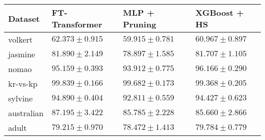 \begin{tabular}{llll}
\toprule
Dataset & FT-Transformer & MLP + Pruning & XGBoost + HS \\
\midrule
volkert & $62.373 \pm 0.915$ & $59.915 \pm 0.781$ & $60.967 \pm 0.897$ \\
jasmine & $81.890 \pm 2.149$ & $78.897 \pm 1.585$ & $81.707 \pm 1.105$ \\
nomao & $95.159 \pm 0.393$ & $93.912 \pm 0.775$ & $96.166 \pm 0.290$ \\
kr-vs-kp & $99.839 \pm 0.166$ & $99.682 \pm 0.173$ & $99.368 \pm 0.205$ \\
sylvine & $94.890 \pm 0.404$ & $92.811 \pm 0.559$ & $94.427 \pm 0.623$ \\
australian & $87.195 \pm 3.422$ & $85.785 \pm 2.228$ & $85.660 \pm 2.866$ \\
adult & $79.215 \pm 0.970$ & $78.472 \pm 1.413$ & $79.784 \pm 0.779$ \\
\bottomrule
\end{tabular}
